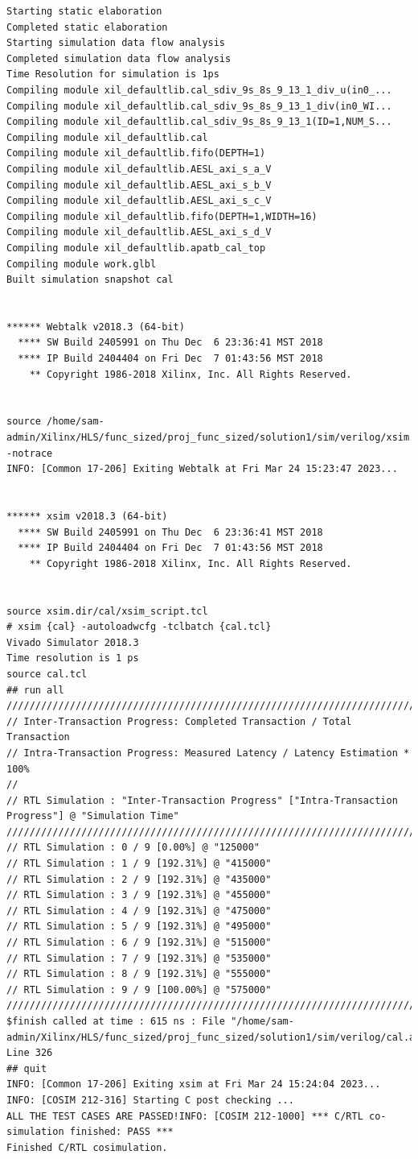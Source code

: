 \documentclass{article}
\begin{document}
\begin{lstlisting}
Starting static elaboration
Completed static elaboration
Starting simulation data flow analysis
Completed simulation data flow analysis
Time Resolution for simulation is 1ps
Compiling module xil_defaultlib.cal_sdiv_9s_8s_9_13_1_div_u(in0_...
Compiling module xil_defaultlib.cal_sdiv_9s_8s_9_13_1_div(in0_WI...
Compiling module xil_defaultlib.cal_sdiv_9s_8s_9_13_1(ID=1,NUM_S...
Compiling module xil_defaultlib.cal
Compiling module xil_defaultlib.fifo(DEPTH=1)
Compiling module xil_defaultlib.AESL_axi_s_a_V
Compiling module xil_defaultlib.AESL_axi_s_b_V
Compiling module xil_defaultlib.AESL_axi_s_c_V
Compiling module xil_defaultlib.fifo(DEPTH=1,WIDTH=16)
Compiling module xil_defaultlib.AESL_axi_s_d_V
Compiling module xil_defaultlib.apatb_cal_top
Compiling module work.glbl
Built simulation snapshot cal


****** Webtalk v2018.3 (64-bit)
  **** SW Build 2405991 on Thu Dec  6 23:36:41 MST 2018
  **** IP Build 2404404 on Fri Dec  7 01:43:56 MST 2018
    ** Copyright 1986-2018 Xilinx, Inc. All Rights Reserved.


source /home/sam-admin/Xilinx/HLS/func_sized/proj_func_sized/solution1/sim/verilog/xsim.dir/cal/webtalk/xsim_webtalk.tcl -notrace
INFO: [Common 17-206] Exiting Webtalk at Fri Mar 24 15:23:47 2023...


****** xsim v2018.3 (64-bit)
  **** SW Build 2405991 on Thu Dec  6 23:36:41 MST 2018
  **** IP Build 2404404 on Fri Dec  7 01:43:56 MST 2018
    ** Copyright 1986-2018 Xilinx, Inc. All Rights Reserved.


source xsim.dir/cal/xsim_script.tcl
# xsim {cal} -autoloadwcfg -tclbatch {cal.tcl}
Vivado Simulator 2018.3
Time resolution is 1 ps
source cal.tcl
## run all
////////////////////////////////////////////////////////////////////////////////////
// Inter-Transaction Progress: Completed Transaction / Total Transaction
// Intra-Transaction Progress: Measured Latency / Latency Estimation * 100%
//
// RTL Simulation : "Inter-Transaction Progress" ["Intra-Transaction Progress"] @ "Simulation Time"
////////////////////////////////////////////////////////////////////////////////////
// RTL Simulation : 0 / 9 [0.00%] @ "125000"
// RTL Simulation : 1 / 9 [192.31%] @ "415000"
// RTL Simulation : 2 / 9 [192.31%] @ "435000"
// RTL Simulation : 3 / 9 [192.31%] @ "455000"
// RTL Simulation : 4 / 9 [192.31%] @ "475000"
// RTL Simulation : 5 / 9 [192.31%] @ "495000"
// RTL Simulation : 6 / 9 [192.31%] @ "515000"
// RTL Simulation : 7 / 9 [192.31%] @ "535000"
// RTL Simulation : 8 / 9 [192.31%] @ "555000"
// RTL Simulation : 9 / 9 [100.00%] @ "575000"
////////////////////////////////////////////////////////////////////////////////////
$finish called at time : 615 ns : File "/home/sam-admin/Xilinx/HLS/func_sized/proj_func_sized/solution1/sim/verilog/cal.autotb.v" Line 326
## quit
INFO: [Common 17-206] Exiting xsim at Fri Mar 24 15:24:04 2023...
INFO: [COSIM 212-316] Starting C post checking ...
ALL THE TEST CASES ARE PASSED!INFO: [COSIM 212-1000] *** C/RTL co-simulation finished: PASS ***
Finished C/RTL cosimulation.



\end{lstlisting}
\vspace{5cm}
\end{document}
